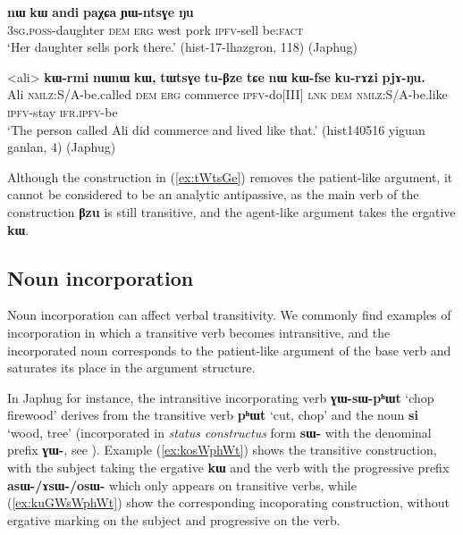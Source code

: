 \documentclass[oneside,a4paper,11pt]{article}
\newcommand{\ipa}[1]{{\phon\textbf{#1}}}
\begin{document}
\begin{exe}
\ex \label{ex:YWntsGe}
\gll \ipa{ɯ-me} 	\ipa{nɯ} 	\ipa{kɯ} 	\ipa{andi} 	\ipa{paχɕa} 	\ipa{ɲɯ-ntsɣe} 	\ipa{ŋu} \\
\textsc{3sg.poss}-daughter \textsc{dem} \textsc{erg} west pork \textsc{ipfv}-sell be:\textsc{fact} \\
\glt `Her daughter sells pork there.' (hist-17-lhazgron, 118) (Japhug)
\end{exe}


\begin{exe}
\ex \label{ex:tWtsGe}
\gll <ali> 	\ipa{kɯ-rmi} 	\ipa{nɯnɯ} 	\ipa{kɯ,} 	\ipa{tɯtsɣe} 	\ipa{tu-βze} 	\ipa{tɕe} 	\ipa{nɯ} 	\ipa{kɯ-fse} 	\ipa{ku-rɤʑi} 	\ipa{pjɤ-ŋu.}  \\
Ali \textsc{nmlz}:S/A-be.called \textsc{dem} \textsc{erg} commerce \textsc{ipfv}-do[III] \textsc{lnk} \textsc{dem} \textsc{nmlz}:S/A-be.like \textsc{ipfv}-stay \textsc{ifr.ipfv}-be \\
\glt `The person called Ali did commerce and lived like that.' (hist140516 yiguan ganlan, 4) (Japhug)
\end{exe}

Although the construction in (\ref{ex:tWtsGe}) removes the patient-like argument, it cannot be considered to be an analytic antipassive, as the main verb of the construction \ipa{βzu} is still transitive, and the agent-like argument takes the ergative \ipa{kɯ}. 


\subsection{Noun incorporation} \label{sec:incorp}
Noun incorporation can affect verbal transitivity. We commonly find examples of incorporation in which a transitive verb becomes intransitive, and the incorporated noun corresponds to the patient-like argument of the base verb and saturates its place in the argument structure.

In Japhug for instance, the intransitive incorporating verb \ipa{ɣɯ-sɯ-pʰɯt} `chop firewood' derives from the transitive verb \ipa{pʰɯt} `cut, chop' and the noun  \ipa{si} `wood, tree' (incorporated in \textit{status constructus} form \ipa{sɯ-} with the denominal prefix \ipa{ɣɯ-}, see  \citealt{jacques12incorp}). Example (\ref{ex:kosWphWt}) shows the transitive construction, with the subject taking the ergative \ipa{kɯ} and the verb with the progressive prefix \ipa{asɯ-/ɤsɯ-/osɯ-} which only appears on transitive verbs, while (\ref{ex:kuGWsWphWt}) show the corresponding incoporating construction, without ergative marking on the subject and progressive on the verb.
\end{document}
